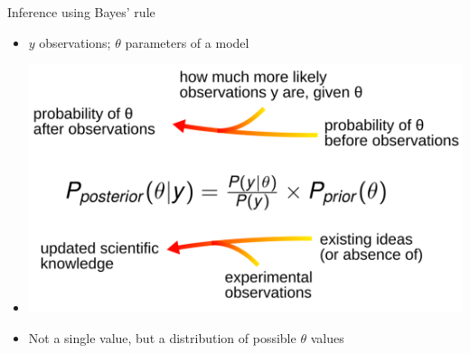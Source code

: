 \documentclass[10pt]{beamer}
\begin{document}
\begin{frame}{Inference using Bayes' rule}
  \begin{itemize}
  \item $y$ observations; $\theta$ parameters of a model
\item[] \includegraphics[width=.9\textwidth]{bayes-3.png}
    \item Not a single value, but a distribution of possible $\theta$ values
  \end{itemize}
\end{frame}
\end{document}
